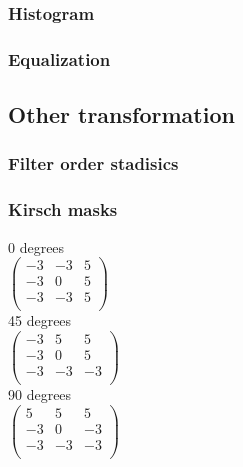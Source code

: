 \documentclass[a4paper]{article}
\begin{document}
\subsubsection{Histogram}
\subsubsection{Equalization}

\subsection{Other transformation}
\subsubsection{Filter order stadisics}
\subsubsection{Kirsch masks}

0 degrees \\

\begin{math}
   \begin{pmatrix} 
   -3 & -3 & 5 \\ 
   -3 & 0 & 5 \\
   -3 & -3 & 5 \\ 
   \end{pmatrix}
\end{math}\\

45 degrees \\

\begin{math}
   \begin{pmatrix} 
   -3 & 5 & 5 \\ 
   -3 & 0 & 5 \\
   -3 & -3 & -3 \\ 
   \end{pmatrix}
\end{math}\\

90 degrees \\

\begin{math}
   \begin{pmatrix} 
   5 & 5 & 5 \\ 
   -3 & 0 & -3 \\
   -3 & -3 & -3 \\ 
   \end{pmatrix}
\end{math}\\
\end{document}
